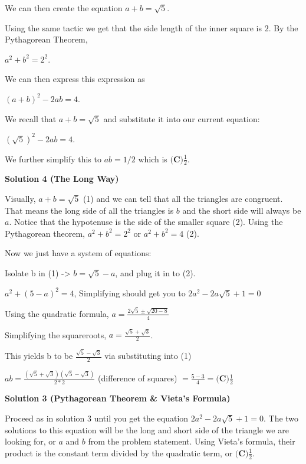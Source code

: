 \begin{enumerate}
 We can then create the equation $a+b=\sqrt5$.

 Using the same tactic we get that the side length of the inner square is $2$. By the Pythagorean Theorem,

 $a^2 + b^2 = 2^2$.

 We can then express this expression as

 $(a+b)^2 - 2ab = 4$.

 We recall that $a+b=\sqrt5$ and substitute it into our current equation:

 $(\sqrt5)^2 - 2ab = 4$.

 We further simplify this to $ab=1/2$ which is $\boxed{\textbf{(C)} \frac {1}{2}}$.

 



\textbf{Solution 4 (The Long Way)}

Visually, $a+b=\sqrt5$ (1) and we can tell that all the triangles are congruent. That means the long side of all the triangles is $b$ and the short side will always be $a$. Notice that the hypotenuse is the side of the smaller square (2). Using the Pythagorean theorem, $a^2+b^2=2^2$ or $a^2+b^2=4$ (2).

 Now we just have a system of equations:

 Isolate b in (1) -> $b=\sqrt5-a$, and plug it in to (2).

 $a^2+(5-a)^2=4$, Simplifying should get you to $2a^2-2a\sqrt5+1=0$

 Using the quadratic formula, $a=\frac{2\sqrt5 \pm \sqrt{20-8}}{4}$

 Simplifying the squareroots, $a=\frac{\sqrt5+\sqrt3}{2}$.

 This yields b to be $\frac{\sqrt5-\sqrt3}{2}$ via substituting into (1)

 $ab=\frac{(\sqrt5+\sqrt3)(\sqrt5-\sqrt3)}{2*2}$ (difference of squares) $= \frac{5-3}{4} = \boxed{\textbf{(C)} \frac {1}{2}}$




\textbf{Solution 3 (Pythagorean Theorem & Vieta's Formula)}

Proceed as in solution 3 until you get the equation $2a^2-2a\sqrt5+1=0$. The two solutions to this equation will be the long and short side of the triangle we are looking for, or $a$ and $b$ from the problem statement. Using Vieta's formula, their product is the constant term divided by the quadratic term, or $\boxed{\textbf{(C)} \frac {1}{2}}$.

 


\end{enumerate}